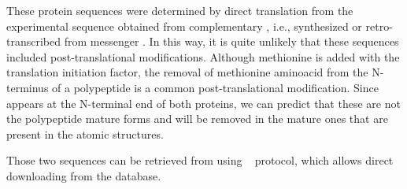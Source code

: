  
 These protein sequences were determined by direct translation from the experimental sequence obtained from complementary , i.e.,  synthesized or retro-transcribed from messenger . In this way, it is quite unlikely that these sequences included post-translational modifications. Although methionine is added with the translation  initiation factor, the removal of methionine aminoacid from the N-terminus of a polypeptide is a common post-translational modification. Since  appears at the N-terminal end of both proteins, we can predict that these are not the polypeptide mature forms and  will be removed in the mature ones that are present in the atomic structures. 
 
 Those two sequences can be retrieved from  using \scipion\  protocol, which allows direct downloading from the database.
 

